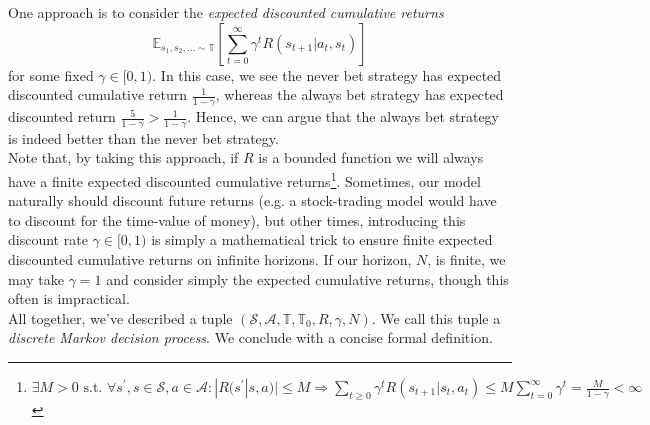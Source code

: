 \documentclass[12pt]{article}
\begin{document}
One approach is to consider the \textit{expected discounted cumulative returns} 
$$
\mathbb{E}_{s_1, s_2, \dots \sim \mathbb{T}}\left[\sum_{t=0}^\infty \gamma^t R(s_{t+1} | a_t, s_t)\right]
$$
for some fixed $\gamma \in [0,1)$. In this case, we see the never bet strategy has expected discounted cumulative return 
$\frac{1}{1 - \gamma}$, whereas the always bet strategy has expected discounted return $\frac{5}{1 - \gamma} > 
\frac{1}{1 - \gamma}$. Hence, we can argue that the always bet strategy is indeed better than the never bet strategy. \\

Note that, by taking this approach, if $R$ is a bounded function we will always have a finite expected discounted cumulative 
returns\footnote{
    $\exists M > 0 \text{ s.t. } \forall s^\prime, s \in \mathcal{S}, a \in \mathcal{A}: |R(s^\prime | s, a)| \leq M 
    \Rightarrow \sum_{t \geq 0}\gamma^t R(s_{t+1} | s_t, a_t) \leq M \sum_{t = 0}^\infty \gamma^t  = \frac{M}{1 - \gamma} < \infty$
}. Sometimes, our model naturally should discount future returns (e.g. a stock-trading model would have to discount for the 
time-value of money), but other times, introducing this discount rate $\gamma \in [0,1)$ is simply a mathematical trick to 
ensure finite expected discounted cumulative returns on infinite horizons. If our horizon, $N$, is finite, we may take 
$\gamma = 1$ and consider simply the expected cumulative returns, though this often is impractical. \\ 

All together, we've described a tuple $(\mathcal{S}, \mathcal{A}, \mathbb{T}, \mathbb{T}_0, R, \gamma, N)$. We call this tuple 
a \textit{discrete Markov decision process}. We conclude with a concise formal definition. 
\end{document}
